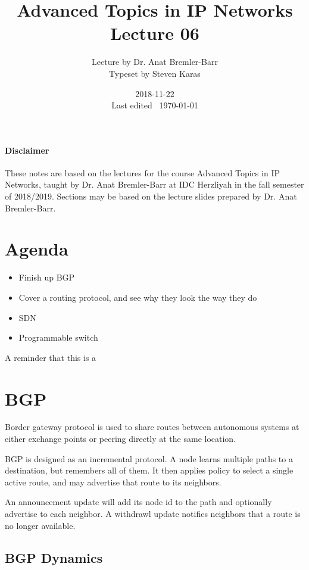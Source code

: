 \documentclass{idc_msc}
\title{Advanced Topics in IP Networks \\\large Lecture 06}
\date{2018-11-22 \\ Last edited \currenttime\ \today}
\author{Lecture by Dr. Anat Bremler-Barr\\Typeset by Steven Karas}
\begin{document}
\maketitle

\paragraph{Disclaimer}

These notes are based on the lectures for the course Advanced Topics in IP Networks, taught by Dr. Anat Bremler-Barr at IDC Herzliyah in the fall semester of 2018/2019.
Sections may be based on the lecture slides prepared by Dr. Anat Bremler-Barr.

\nocite{Varghese:2004:NAI:1203994}
\nocite{Crovella:2006:IMI:1196480}
\nocite{Kurose:2002:CNT:549735}

\section{Agenda}

\begin{itemize}
  \item Finish up BGP
  \item Cover a routing protocol, and see why they look the way they do
  \item SDN
  \item Programmable switch
\end{itemize}

A reminder that this is a 

\section{BGP}

Border gateway protocol is used to share routes between autonomous systems at either exchange points or peering directly at the same location.

BGP is designed as an incremental protocol.
A node learns multiple paths to a destination, but remembers all of them.
It then applies policy to select a single active route, and may advertise that route to its neighbors.

An announcement update will add its node id to the path and optionally advertise to each neighbor.
A withdrawl update notifies neighbors that a route is no longer available.

\subsection{BGP Dynamics}
\end{document}
